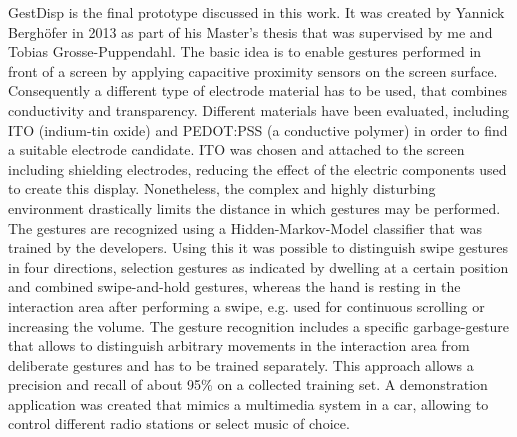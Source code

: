 GestDisp is the final prototype discussed in this work. It was created by Yannick Berghöfer in 2013 as part of his Master's thesis that was supervised by me and Tobias Grosse-Puppendahl. The basic idea is to enable gestures performed in front of a screen by applying capacitive proximity sensors on the screen surface. Consequently a different type of electrode material has to be used, that combines conductivity and transparency. Different materials have been evaluated, including ITO (indium-tin oxide) and PEDOT:PSS (a conductive polymer) in order to find a suitable electrode candidate. ITO was chosen and attached to the screen including shielding electrodes, reducing the effect of the electric components used to create this display. Nonetheless, the complex and highly disturbing environment drastically limits the distance in which gestures may be performed. The gestures are recognized using a Hidden-Markov-Model classifier that was trained by the developers.  Using this it was possible to distinguish swipe gestures in four directions, selection gestures as indicated by dwelling at a certain position and combined swipe-and-hold gestures, whereas the hand is resting in the interaction area after performing a swipe, e.g. used for continuous scrolling or increasing the volume. The gesture recognition includes a specific garbage-gesture that allows to distinguish arbitrary movements in the interaction area from deliberate gestures and has to be trained separately. This approach allows a precision and recall of about 95\% on a collected training set. A demonstration application was created that mimics a multimedia system in a car, allowing to control different radio stations or select music of choice.  
